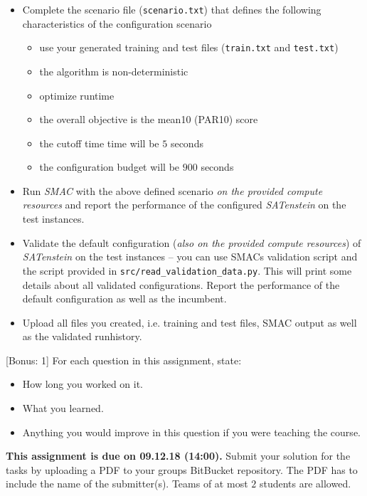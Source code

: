 \documentclass{exam}
\newcommand{\duedate}{09.12.18 (14:00)}
\newcommand{\due}{{\bf This assignment is due on \duedate.} }
\begin{document}
\begin{questions}
\begin{itemize}
			\item Complete the scenario file (\texttt{scenario.txt}) that defines the following characteristics of the configuration scenario
			\begin{itemize}
				\item use your generated training and test files (\texttt{train.txt} and \texttt{test.txt})
				\item the algorithm is non-deterministic
				\item optimize runtime
				\item the overall objective is the mean10 (PAR10) score
				\item the cutoff time time will be $5$ seconds
				\item the configuration budget will be $900$ seconds
			\end{itemize}
			\item Run \textit{SMAC} with the above defined scenario \textit{on the provided compute resources} and report the performance of the configured \textit{SATenstein} on the test instances.
			\item Validate the default configuration (\textit{also on the provided compute resources}) of \textit{SATenstein} on the test instances -- you can use SMACs validation script and the script provided in \texttt{src/read\_validation\_data.py}. This will print some details about all validated configurations.
			Report the performance of the default configuration as well as the incumbent.
			\item Upload all files you created, i.e. training and test files, SMAC output as well as the validated runhistory.
		\end{itemize}
		
		[Bonus: 1]
		For each question in this assignment, state:
		\begin{itemize}
			\item How long you worked on it.
			\item What you learned.
			\item Anything you would improve in this question if you were teaching the course.
		\end{itemize}
	\end{questions}

\noindent
\due Submit your solution for the tasks by uploading a PDF to your groups BitBucket repository. The PDF has to include the name of the submitter(s). Teams of at most $2$ students are allowed.
\end{document}

